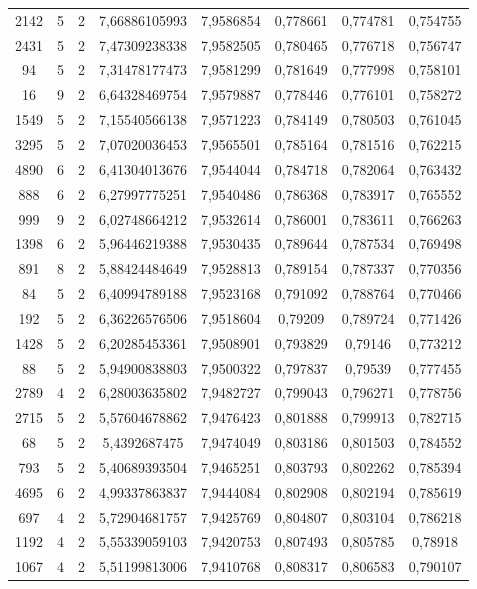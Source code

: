 \begin{longtable}{|c|c|c|c|c|c|c|c|}
2142 & 5 & 2 & 7,66886105993 & 7,9586854 & 0,778661 & 0,774781 & 0,754755 \\
2431 & 5 & 2 & 7,47309238338 & 7,9582505 & 0,780465 & 0,776718 & 0,756747 \\
94 & 5 & 2 & 7,31478177473 & 7,9581299 & 0,781649 & 0,777998 & 0,758101 \\
16 & 9 & 2 & 6,64328469754 & 7,9579887 & 0,778446 & 0,776101 & 0,758272 \\
1549 & 5 & 2 & 7,15540566138 & 7,9571223 & 0,784149 & 0,780503 & 0,761045 \\
3295 & 5 & 2 & 7,07020036453 & 7,9565501 & 0,785164 & 0,781516 & 0,762215 \\
4890 & 6 & 2 & 6,41304013676 & 7,9544044 & 0,784718 & 0,782064 & 0,763432 \\
888 & 6 & 2 & 6,27997775251 & 7,9540486 & 0,786368 & 0,783917 & 0,765552 \\
999 & 9 & 2 & 6,02748664212 & 7,9532614 & 0,786001 & 0,783611 & 0,766263 \\
1398 & 6 & 2 & 5,96446219388 & 7,9530435 & 0,789644 & 0,787534 & 0,769498 \\
891 & 8 & 2 & 5,88424484649 & 7,9528813 & 0,789154 & 0,787337 & 0,770356 \\
84 & 5 & 2 & 6,40994789188 & 7,9523168 & 0,791092 & 0,788764 & 0,770466 \\
192 & 5 & 2 & 6,36226576506 & 7,9518604 & 0,79209 & 0,789724 & 0,771426 \\
1428 & 5 & 2 & 6,20285453361 & 7,9508901 & 0,793829 & 0,79146 & 0,773212 \\
88 & 5 & 2 & 5,94900838803 & 7,9500322 & 0,797837 & 0,79539 & 0,777455 \\
2789 & 4 & 2 & 6,28003635802 & 7,9482727 & 0,799043 & 0,796271 & 0,778756 \\
2715 & 5 & 2 & 5,57604678862 & 7,9476423 & 0,801888 & 0,799913 & 0,782715 \\
68 & 5 & 2 & 5,4392687475 & 7,9474049 & 0,803186 & 0,801503 & 0,784552 \\
793 & 5 & 2 & 5,40689393504 & 7,9465251 & 0,803793 & 0,802262 & 0,785394 \\
4695 & 6 & 2 & 4,99337863837 & 7,9444084 & 0,802908 & 0,802194 & 0,785619 \\
697 & 4 & 2 & 5,72904681757 & 7,9425769 & 0,804807 & 0,803104 & 0,786218 \\
1192 & 4 & 2 & 5,55339059103 & 7,9420753 & 0,807493 & 0,805785 & 0,78918 \\
1067 & 4 & 2 & 5,51199813006 & 7,9410768 & 0,808317 & 0,806583 & 0,790107 \\

\end{longtable}
